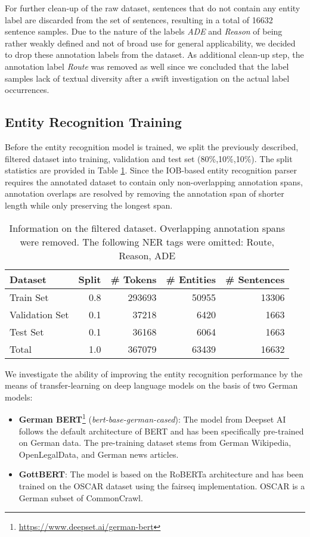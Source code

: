 \documentclass[runningheads]{llncs}
\begin{document}
For further clean-up of the raw dataset, sentences that do not contain any entity label are discarded from the set of sentences, resulting in a total of 16632 sentence samples. Due to the nature of the labels \textit{ADE} and \textit{Reason} of being rather weakly defined and not of broad use for general applicability, we decided to drop these annotation labels from the dataset. As additional clean-up step, the annotation label \textit{Route} was removed as well since we concluded that the label samples lack of textual diversity after a swift investigation on the actual label occurrences.

\subsection{Entity Recognition Training}
Before the entity recognition model is trained, we split the previously described, filtered dataset into training, validation and test set (80\%,10\%,10\%). The split statistics are provided in Table \ref{tab:cleaneddataset}. Since the IOB-based entity recognition parser requires the annotated dataset to contain only non-overlapping annotation spans, annotation overlaps are resolved by removing the annotation span of shorter length while only preserving the longest span.
\begin{table}[!ht]
    \centering
    \begin{tabular}{l|r|r|r|r}
        \hline
        \textbf{Dataset} & \textbf{Split} & \textbf{\# Tokens} & \textbf{\# Entities} & \textbf{\# Sentences} \\
        \hline
        \hline
        Train Set      & 0.8 & 293693 & 50955 & 13306 \\
        Validation Set & 0.1 & 37218  & 6420  & 1663  \\
        Test Set       & 0.1 & 36168  & 6064  & 1663  \\
        \hline
        Total          & 1.0 & 367079 & 63439 & 16632 \\
        \hline
    \end{tabular}
    \caption{Information on the filtered dataset. Overlapping annotation spans were removed. The following NER tags were omitted: Route, Reason, ADE}
    \label{tab:cleaneddataset}
\end{table}

We investigate the ability of improving the entity recognition performance by the means of transfer-learning on deep language models on the basis of two German models:
\begin{itemize}
    \item \textbf{German BERT}\cite{chan_german_2019}\footnote{\url{https://www.deepset.ai/german-bert}} (\textit{bert-base-german-cased}): The model from Deepset AI follows the default architecture of BERT and has been specifically pre-trained on German data. The pre-training dataset stems from German Wikipedia, OpenLegalData, and German news articles.
    \item \textbf{GottBERT}\cite{schreible_gottbert_2020}: The model is based on the RoBERTa architecture and has been trained on the OSCAR dataset using the fairseq implementation. OSCAR is a German subset of CommonCrawl.
\end{itemize}
\end{document}
